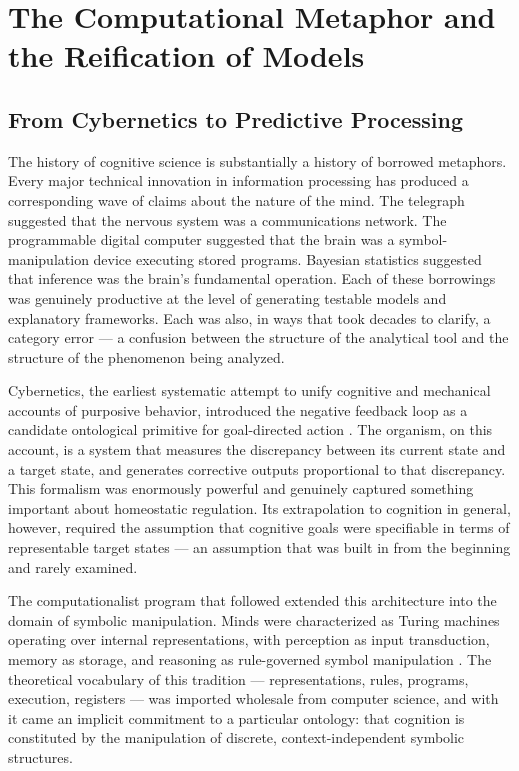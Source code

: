 \documentclass[12pt,a4paper]{report}
\theoremstyle{flyxion}
\begin{document}
\chapter{The Computational Metaphor and the Reification of Models}

\section{From Cybernetics to Predictive Processing}

The history of cognitive science is substantially a history of borrowed metaphors. Every major technical innovation in information processing has produced a corresponding wave of claims about the nature of the mind. The telegraph suggested that the nervous system was a communications network. The programmable digital computer suggested that the brain was a symbol-manipulation device executing stored programs. Bayesian statistics suggested that inference was the brain's fundamental operation. Each of these borrowings was genuinely productive at the level of generating testable models and explanatory frameworks. Each was also, in ways that took decades to clarify, a category error --- a confusion between the structure of the analytical tool and the structure of the phenomenon being analyzed.

Cybernetics, the earliest systematic attempt to unify cognitive and mechanical accounts of purposive behavior, introduced the negative feedback loop as a candidate ontological primitive for goal-directed action \cite{wiener}. The organism, on this account, is a system that measures the discrepancy between its current state and a target state, and generates corrective outputs proportional to that discrepancy. This formalism was enormously powerful and genuinely captured something important about homeostatic regulation. Its extrapolation to cognition in general, however, required the assumption that cognitive goals were specifiable in terms of representable target states --- an assumption that was built in from the beginning and rarely examined.

The computationalist program that followed extended this architecture into the domain of symbolic manipulation. Minds were characterized as Turing machines operating over internal representations, with perception as input transduction, memory as storage, and reasoning as rule-governed symbol manipulation \cite{fodor,newell}. The theoretical vocabulary of this tradition --- representations, rules, programs, execution, registers --- was imported wholesale from computer science, and with it came an implicit commitment to a particular ontology: that cognition is constituted by the manipulation of discrete, context-independent symbolic structures.
\end{document}
